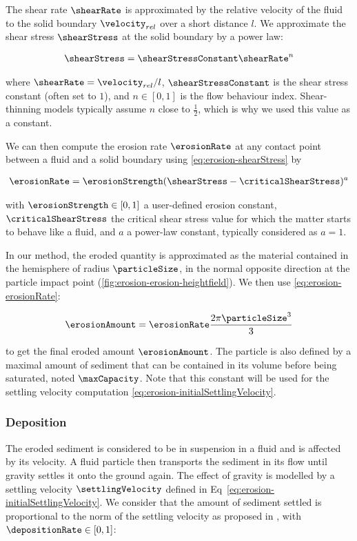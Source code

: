 The shear rate $\shearRate$ is approximated by the relative velocity of the fluid to the solid boundary $\velocity_{rel}$ over a short distance $l$.
We approximate the shear stress $\shearStress$ at the solid boundary by a power law:

\begin{align}\label{eq:erosion-shearStress}
    \shearStress = \shearStressConstant \shearRate^n
\end{align}

where $\shearRate = \velocity_{rel}/l$, $\shearStressConstant$ is the shear stress constant (often set to $1$), and $n \in [0,1]$ is the flow behaviour index. Shear-thinning models typically assume $n$ close to $\frac{1}{2}$, which is why we used this value as a constant.  

We can then compute the erosion rate $\erosionRate$ at any contact point between a fluid and a solid boundary using \eqref{eq:erosion-shearStress} by 

\begin{align}\label{eq:erosion-erosionRate}
    \erosionRate = \erosionStrength (\shearStress - \criticalShearStress)^a
\end{align}

with $\erosionStrength \in [0,1]$ a user-defined erosion constant, $\criticalShearStress$ the critical shear stress value for which the matter starts to behave like a fluid, and $a$ a power-law constant, typically considered as $a = 1$. 

In our method, the eroded quantity is approximated as the material contained in the hemisphere of radius $\particleSize$, in the normal opposite direction at the particle impact point (\cref{fig:erosion-erosion-heightfield}). We then use \eqref{eq:erosion-erosionRate}: 

\begin{align}
    \label{eq:erosion-erosionAmount} 
    \erosionAmount = \erosionRate \frac{ 2 \pi \particleSize^3 }{ 3 }
\end{align}

to get the final eroded amount $\erosionAmount$. The particle is also defined by a maximal amount of sediment that can be contained in its volume before being saturated, noted $\maxCapacity$. Note that this constant will be used for the settling velocity computation \eqref{eq:erosion-initialSettlingVelocity}.

\subsubsection{Deposition}
The eroded sediment is considered to be in suspension in a fluid and is affected by its velocity. A fluid particle then transports the sediment in its flow until gravity settles it onto the ground again. The effect of gravity is modelled by a settling velocity $\settlingVelocity$ defined in Eq~\eqref{eq:erosion-initialSettlingVelocity}. We consider that the amount of sediment settled is proportional to the norm of the settling velocity as proposed in \cite{Wojtan2007}, with $\depositionRate \in [0,1]$: 

